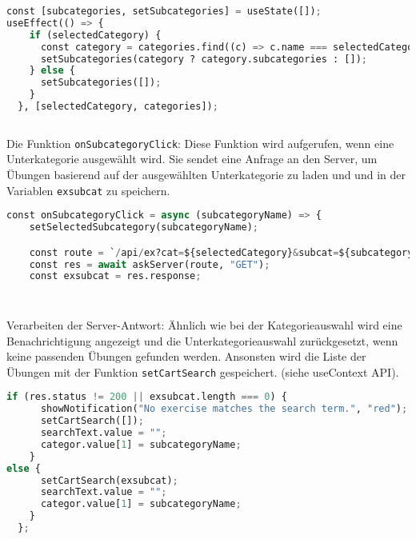 \begin{lstlisting}[language=Python]
const [subcategories, setSubcategories] = useState([]);
useEffect(() => {
    if (selectedCategory) {
      const category = categories.find((c) => c.name === selectedCategory);
      setSubcategories(category ? category.subcategories : []);
    } else {
      setSubcategories([]);
    }
  }, [selectedCategory, categories]);
      
\end{lstlisting}





Die Funktion \texttt{onSubcategoryClick}: Diese Funktion wird aufgerufen, wenn eine Unterkategorie ausgewählt wird. Sie sendet eine Anfrage an den Server, um Übungen basierend auf der ausgewählten Unterkategorie zu laden und und in der Variablen \texttt{exsubcat} zu speichern.

\begin{lstlisting}[language=Python]
  const onSubcategoryClick = async (subcategoryName) => {
    setSelectedSubcategory(subcategoryName);

    const route = `/api/ex?cat=${selectedCategory}&subcat=${subcategoryName}`;
    const res = await askServer(route, "GET");
    const exsubcat = res.response;
    
    
\end{lstlisting}

Verarbeiten der Server-Antwort: Ähnlich wie bei der Kategorieauswahl wird eine Benachrichtigung angezeigt und die Unterkategorieauswahl zurückgesetzt, wenn keine passenden Übungen gefunden werden. Ansonsten wird die Liste der Übungen mit der Funktion \texttt{setCartSearch} gespeichert. (siehe useContext API).


\begin{lstlisting}[language=Python]
if (res.status != 200 || exsubcat.length === 0) {
      showNotification("No exercise matches the search term.", "red");
      setCartSearch([]);
      searchText.value = "";
      categor.value[1] = subcategoryName;
    }
else {
      setCartSearch(exsubcat);
      searchText.value = "";
      categor.value[1] = subcategoryName;
    }
  };
\end{lstlisting}